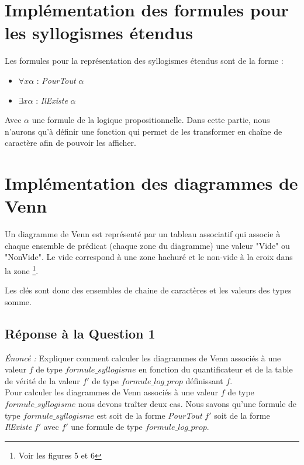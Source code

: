 \documentclass[12pt, letterpaper, french]{article}
\begin{document}
\section {Implémentation des formules pour les syllogismes étendus}

Les formules pour la représentation des syllogismes étendus sont de la forme :
\begin{itemize}
    \item $\forall x \alpha$ : \emph{PourTout} $\alpha$
    \item $\exists x \alpha$ : \emph{IlExiste} $\alpha$
\end{itemize}

Avec $\alpha$ une formule de la logique propositionnelle.
Dans cette partie, nous n'aurons qu'à définir une fonction qui permet de les 
transformer en chaîne de caractère afin de pouvoir les afficher.

\section{Implémentation des diagrammes de Venn}

Un diagramme de Venn est représenté par un tableau associatif qui associe à 
chaque ensemble de prédicat (chaque zone du diagramme) une valeur "Vide" ou "NonVide". Le vide correspond à une zone hachuré et le non-vide à la croix dans la zone \footnote{Voir les figures 5 et 6}.

Les clés sont donc des ensembles de chaine de caractères et les valeurs des types somme.

\subsection{Réponse à la Question 1} 

\emph{Énoncé :} Expliquer comment calculer les diagrammes de Venn associés à
une valeur $f$ de type $formule\_syllogisme$ en fonction du quantificateur 
et de la table de vérité de la valeur $f'$ de type $formule\_log\_prop$
définissant $f$.
\\

Pour calculer les diagrammes de Venn associés à une valeur $f$ de type 
$formule\_syllogisme$ nous devons traîter deux cas. Nous savons qu'une formule 
de type $formule\_syllogisme$ est soit de la forme \emph{PourTout} $f'$ soit de
la forme \emph{IlExiste} $f'$ avec $f'$ une formule de type $formule\_log\_prop$.
\\ 
\end{document}
